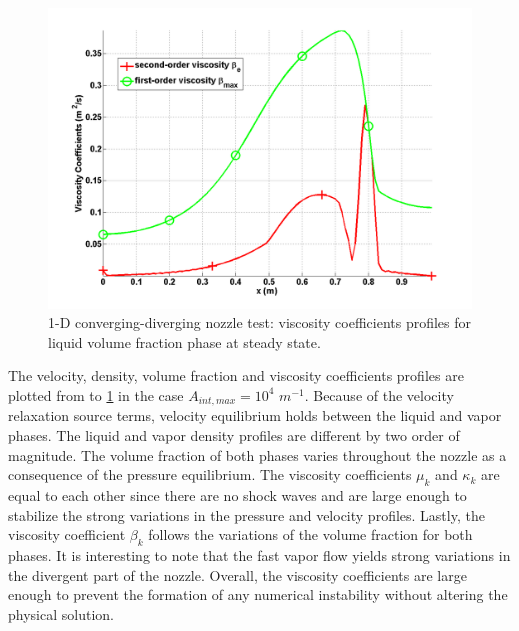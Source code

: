 \begin{figure}[H]
\centering
\includegraphics[width=\textwidth]{figures/SEM/Aint1e4_liquid_beta.png}
\caption{1-D converging-diverging nozzle test: viscosity coefficients profiles for liquid volume fraction phase at steady state.}
\label{fig:two-fluids-rel-nozzle-visc-vf-sem-sect4}
\end{figure}
%
The velocity, density, volume fraction and viscosity coefficients profiles are plotted from  to \ref{fig:two-fluids-rel-nozzle-visc-vf-sem-sect4} in the case $A_{int,max} = 10^4$ $m^{-1}$. Because of the velocity relaxation source terms, velocity equilibrium holds between the liquid and vapor phases. The liquid and vapor density profiles are different by two order of magnitude. The volume fraction of both phases varies throughout the nozzle as a consequence of the pressure equilibrium. The viscosity coefficients $\mu_k$ and $\kappa_k$ are equal to each other since there are no shock waves and are large enough to stabilize the strong variations in the pressure and velocity profiles. Lastly, the viscosity coefficient $\beta_k$ follows the variations of the volume fraction for both phases. It is interesting to note that the fast vapor flow yields strong variations in the divergent part of the nozzle. Overall, the viscosity coefficients are large enough to prevent the formation of any numerical instability without altering the physical solution.

